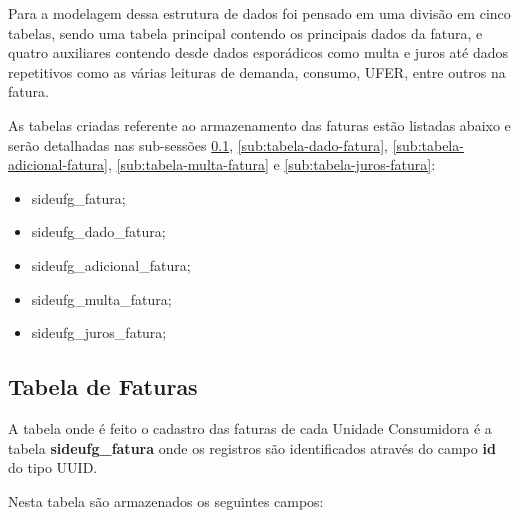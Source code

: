 Para a modelagem dessa estrutura de dados foi pensado em uma divisão em cinco tabelas, sendo uma tabela principal contendo os principais dados da fatura, e quatro auxiliares contendo desde dados esporádicos como multa e juros até dados repetitivos como as várias leituras de demanda, consumo, UFER, entre outros na fatura.

\newpage

As tabelas criadas referente ao armazenamento das faturas estão listadas abaixo e serão detalhadas nas sub-sessões \ref{sub:tabela-fatura}, \ref{sub:tabela-dado-fatura}, \ref{sub:tabela-adicional-fatura}, \ref{sub:tabela-multa-fatura} e \ref{sub:tabela-juros-fatura}:

\begin{itemize}
    \item sideufg\_fatura;
    \item sideufg\_dado\_fatura;
    \item sideufg\_adicional\_fatura;
    \item sideufg\_multa\_fatura;
    \item sideufg\_juros\_fatura;
\end{itemize}

\subsection{Tabela de Faturas}
\label{sub:tabela-fatura}

A tabela onde é feito o cadastro das faturas de cada Unidade Consumidora é a tabela \textbf{sideufg\_fatura} onde os registros são identificados através do campo \textbf{id} do tipo UUID.

Nesta tabela são armazenados os seguintes campos:

